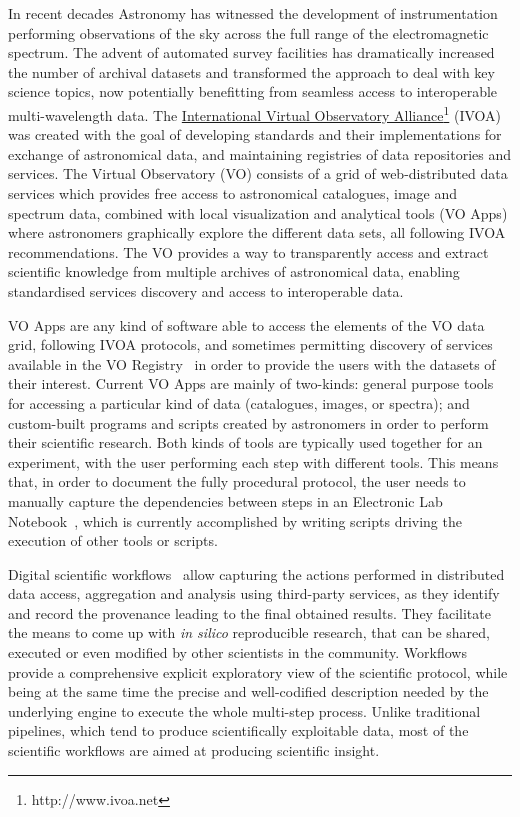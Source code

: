 \documentclass{aa}
\begin{document}
In recent decades Astronomy has witnessed the development of instrumentation performing observations of the sky across the full range of the electromagnetic spectrum. The advent of automated survey facilities has dramatically increased the number of archival datasets and transformed the approach to deal with key science topics, now potentially benefitting from seamless access to interoperable multi-wavelength data. The \href{http://www.ivoa.net}{International Virtual  Observatory Alliance}\footnote{http://www.ivoa.net} (IVOA) was created with the goal of developing standards and their implementations for exchange of astronomical data, and maintaining registries of data repositories and services. The Virtual Observatory (VO) consists of a grid of web-distributed data services which provides free access to astronomical catalogues, image and spectrum data, combined with local visualization and analytical tools (VO Apps) where astronomers graphically explore the different data sets, all following IVOA recommendations. The VO provides a way to transparently access and extract scientific knowledge from multiple archives of astronomical data, enabling standardised services discovery and access to interoperable data. 

VO Apps are any kind of software able to access the elements of the VO data grid, following IVOA protocols, and sometimes permitting discovery of services available in the VO Registry~\citep{Benson2009} in order to provide the users with the datasets of their interest. Current VO Apps are mainly of two-kinds: general purpose tools for accessing a particular kind of data (catalogues, images, or spectra); and custom-built programs and scripts created by astronomers in order to perform their scientific research. Both kinds of tools are typically used together for an experiment, with the user performing each step with different tools. This means that, in order to document the fully procedural protocol, the user needs to manually capture the dependencies between steps in an Electronic Lab Notebook~\citep{5577251}, which is currently accomplished by writing scripts driving the execution of other tools or scripts.

Digital scientific workflows~\citep{Gil2007, Gil2008} allow capturing the actions performed in distributed data access, aggregation and analysis using third-party services, as they identify and record the provenance leading to the final obtained results. They facilitate the means to come up with \emph{in silico} reproducible research, that can be shared, executed or even modified by other scientists in the community. Workflows provide a comprehensive explicit exploratory view of the scientific protocol, while being at the same time the precise and well-codified description needed by the underlying engine to execute the whole multi-step process. Unlike traditional pipelines, which tend to produce scientifically exploitable data, most of the scientific workflows are aimed at producing scientific insight.
\end{document}
